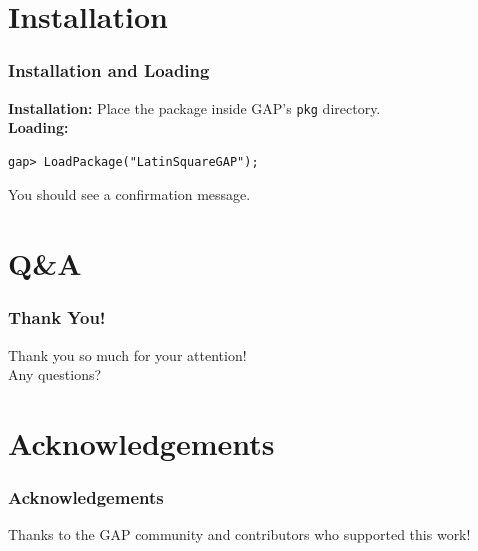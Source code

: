 \documentclass{beamer}
\begin{document}
\section{Installation}
\begin{frame}[fragile]
\frametitle{Installation and Loading}
\textbf{Installation:}  
Place the package inside GAP's \texttt{pkg} directory.\\
\textbf{Loading:}
\begin{lstlisting}
gap> LoadPackage("LatinSquareGAP");
\end{lstlisting}
You should see a confirmation message.
\end{frame}


\section{Q\&A}
\begin{frame}
	\frametitle{Thank You!}
	\centering
	\Large Thank you so much for your attention!\\[1em]
	\Large Any questions?
\end{frame}

\section{Acknowledgements}
\begin{frame}
\frametitle{Acknowledgements}
Thanks to the GAP community and contributors who supported this work!
\end{frame}
\end{document}
